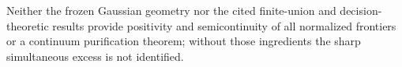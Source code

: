Neither the frozen Gaussian geometry nor the cited finite-union and decision-theoretic results provide positivity and semicontinuity of all normalized frontiers or a continuum purification theorem; without those ingredients the sharp simultaneous excess is not identified.